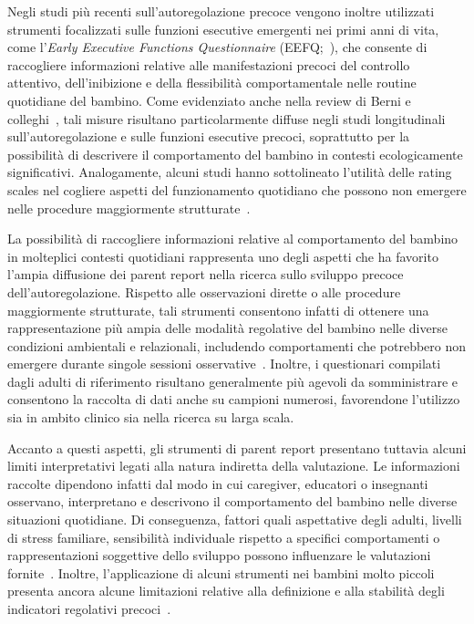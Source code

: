             Negli studi più recenti sull'autoregolazione precoce vengono inoltre utilizzati strumenti focalizzati sulle funzioni esecutive emergenti nei primi anni di vita, come l'\emph{Early Executive Functions Questionnaire} (EEFQ;~\cite{hendry2021}), che consente di raccogliere informazioni relative alle manifestazioni precoci del controllo attentivo, dell'inibizione e della flessibilità comportamentale nelle routine quotidiane del bambino. Come evidenziato anche nella review di Berni e colleghi~\cite{berni2025}, tali misure risultano particolarmente diffuse negli studi longitudinali sull'autoregolazione e sulle funzioni esecutive precoci, soprattutto per la possibilità di descrivere il comportamento del bambino in contesti ecologicamente significativi. Analogamente, alcuni studi hanno sottolineato l'utilità delle rating scales nel cogliere aspetti del funzionamento quotidiano che possono non emergere nelle procedure maggiormente strutturate~\cite{gardiner2017}.

            La possibilità di raccogliere informazioni relative al comportamento del bambino in molteplici contesti quotidiani rappresenta uno degli aspetti che ha favorito l'ampia diffusione dei parent report nella ricerca sullo sviluppo precoce dell'autoregolazione. Rispetto alle osservazioni dirette o alle procedure maggiormente strutturate, tali strumenti consentono infatti di ottenere una rappresentazione più ampia delle modalità regolative del bambino nelle diverse condizioni ambientali e relazionali, includendo comportamenti che potrebbero non emergere durante singole sessioni osservative~\cite{toplak2013,gardiner2017}. Inoltre, i questionari compilati dagli adulti di riferimento risultano generalmente più agevoli da somministrare e consentono la raccolta di dati anche su campioni numerosi, favorendone l'utilizzo sia in ambito clinico sia nella ricerca su larga scala.

            Accanto a questi aspetti, gli strumenti di parent report presentano tuttavia alcuni limiti interpretativi legati alla natura indiretta della valutazione. Le informazioni raccolte dipendono infatti dal modo in cui caregiver, educatori o insegnanti osservano, interpretano e descrivono il comportamento del bambino nelle diverse situazioni quotidiane. Di conseguenza, fattori quali aspettative degli adulti, livelli di stress familiare, sensibilità individuale rispetto a specifici comportamenti o rappresentazioni soggettive dello sviluppo possono influenzare le valutazioni fornite~\cite{toplak2013}. Inoltre, l'applicazione di alcuni strumenti nei bambini molto piccoli presenta ancora alcune limitazioni relative alla definizione e alla stabilità degli indicatori regolativi precoci~\cite{isquith2004}.


